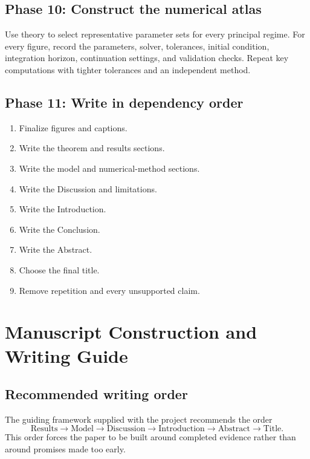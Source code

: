 \documentclass[11pt, reqno]{amsart}
\theoremstyle{definition}
\theoremstyle{remark}
\begin{document}
	\subsection{Phase 10: Construct the numerical atlas}
	
	Use theory to select representative parameter sets for every principal regime.
	For every figure, record the parameters, solver, tolerances, initial condition,
	integration horizon, continuation settings, and validation checks.  Repeat key
	computations with tighter tolerances and an independent method.
	
	\subsection{Phase 11: Write in dependency order}
	
	\begin{enumerate}[label=11.\arabic*,leftmargin=3em]
		\item Finalize figures and captions.
		\item Write the theorem and results sections.
		\item Write the model and numerical-method sections.
		\item Write the Discussion and limitations.
		\item Write the Introduction.
		\item Write the Conclusion.
		\item Write the Abstract.
		\item Choose the final title.
		\item Remove repetition and every unsupported claim.
	\end{enumerate}
	
	\section{Manuscript Construction and Writing Guide}
	\label{app:writing-guide}
	
	\subsection{Recommended writing order}
	
	The guiding framework supplied with the project recommends the order
	\[
	\text{Results}
	\longrightarrow
	\text{Model}
	\longrightarrow
	\text{Discussion}
	\longrightarrow
	\text{Introduction}
	\longrightarrow
	\text{Abstract}
	\longrightarrow
	\text{Title}.
	\]
	This order forces the paper to be built around completed evidence rather than
	around promises made too early.
	
\end{document}
